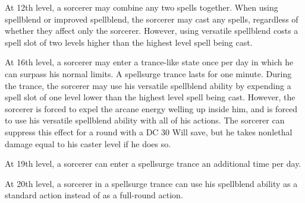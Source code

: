  At 12th level, a sorcerer may combine any two spells together. When using spellblend or improved spellblend, the sorcerer may cast any spells, regardless of whether they affect only the sorcerer. However, using versatile spellblend costs a spell slot of two levels higher than the highest level spell being cast.

 At 16th level, a sorcerer may enter a trance-like state once per day in which he can surpass his normal limits. A spellsurge trance lasts for one minute. During the trance, the sorcerer may use his versatile spellblend ability by expending a spell slot of one level lower than the highest level spell being cast. However, the sorcerer is forced to expel the arcane energy welling up inside him, and is forced to use his versatile spellblend ability with all of his actions. The sorcerer can suppress this effect for a round with a DC 30 Will save, but he takes nonlethal damage equal to his caster level if he does so. %

\par At 19th level, a sorcerer can enter a spellsurge trance an additional time per day.

 At 20th level, a sorcerer in a spellsurge trance can use his spellblend ability as a standard action instead of as a full-round action.

